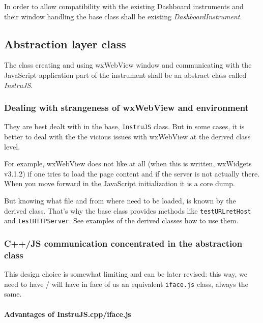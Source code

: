 \documentclass[11pt]{article}
\begin{document}
    In order to allow compatibility with the existing Dashboard instruments
and their window handling the base class shall be existing
\emph{DashboardInstrument}.

    \hypertarget{abstraction-layer-class}{%
\subsection{Abstraction layer class}\label{abstraction-layer-class}}

    The class creating and using wxWebView window and communicating with the
JavaScript application part of the instrument shall be an abstract class
called \emph{InstruJS}.

    \hypertarget{dealing-with-strangeness-of-wxwebview-and-environment}{%
\subsubsection{Dealing with strangeness of wxWebView and
environment}\label{dealing-with-strangeness-of-wxwebview-and-environment}}

    They are best dealt with in the base, \texttt{InstruJS} class. But in
some cases, it is better to deal with the the vicious issues with
wxWebView at the derived class level.

    For example, wxWebView does not like at all (when this is written,
wxWidgets v3.1.2) if one tries to load the page content and if the
server is not actually there. When you move forward in the JavaScript
initialization it is a core dump.

    But knowing what file and from where need to be loaded, is known by the
derived class. That's why the base class provides methods like
\texttt{testURLretHost} and \texttt{testHTTPServer}. See examples of the
derived classes how to use them.

    \hypertarget{cjs-communication-concentrated-in-the-abstraction-class}{%
\subsubsection{C++/JS communication concentrated in the abstraction
class}\label{cjs-communication-concentrated-in-the-abstraction-class}}

    This design choice is somewhat limiting and can be later revised: this
way, we need to have / will have in face of us an equivalent
\texttt{iface.js} class, always the same.

    \hypertarget{advantages-of-instrujs.cppiface.js}{%
\paragraph{Advantages of
InstruJS.cpp/iface.js}\label{advantages-of-instrujs.cppiface.js}}
\end{document}
